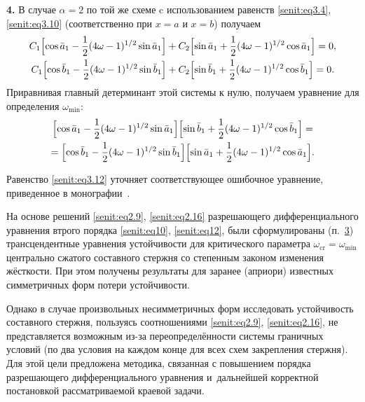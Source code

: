\textbf{4.} В случае $\alpha=2$  по той же схеме c  использованием равенств \eqref{senit:eq3.4},  \eqref{senit:eq3.10} (соответственно при $x=a$ и $x=b$) получаем
\begin{gather*}
C_1 \Bigl[\cos \bar {a}_1 - \frac{1}{2}(4\omega -1)^{{1}/{2}}\sin \bar {a}_1 \Bigr]+
C_2 \Bigl[ \sin \bar{a}_1 +\frac{1}{2}(4\omega -1)^{{1}/{2}}\cos \bar {a}_1 \Bigr]=0, \\
C_1 \Bigl[ \cos \bar {b}_1 -\frac{1}{2}(4\omega -1)^{{1}/{2}}\sin \bar {b}_1 \Bigr]+
C_2 \Bigl[ \sin \bar{b}_1 +\frac{1}{2}(4\omega -1)^{{1}/{2}}\cos \bar {b}_1 \Bigr]=0.
\end{gather*}
Приравнивая главный детерминант этой системы к нулю, получаем уравнение для определения $\omega_{\min}$:
\begin{multline}
\label{senit:eq3.12} 
\Bigl[ \cos \bar{a}_1 -\frac{1}{2}(4\omega
-1)^{{1}/{2}}\sin \bar{a}_1 \Bigr]
\Bigl[ \sin \bar {b}_1 +\frac{1}{2}(4\omega -1)^{{1}/{2}}\cos
\bar {b}_1 \Bigr]= \\
 =
 \Bigl[\cos \bar {b}_1 -\frac{1}{2} ( 4\omega -1)^{{1}/{2}}\sin \bar {b}_1 \Bigr]
 \Bigl[ \sin \bar {a}_1 +\frac{1}{2}(4\omega -1)^{{1}/{2}}\cos \bar {a}_1 \Bigr].
\end{multline}

Равенство \eqref{senit:eq3.12} уточняет соответствующее ошибочное уравнение, приведенное в монографии~\cite{senit:bib3}.

\smallskip

На основе решений \eqref{senit:eq2.9}, \eqref{senit:eq2.16} разрешающего
дифференциального уравнения втрого порядка \eqref{senit:eq10}, \eqref{senit:eq12},
были сформулированы (п.~\hyperlink{senit:p3}{3}) трансцендентные уравнения устойчивости для критического параметра $\omega _{\text{cr}} =\omega _{\min}$ центрально сжатого составного стержня со степенным
законом изменения жёсткости. 
При этом получены результаты для заранее (априори) известных симметричных форм потери устойчивости.

Однако в случае произвольных несимметричных форм исследовать устойчивость составного стержня, пользуясь соотношениями \eqref{senit:eq2.9}, \eqref{senit:eq2.16}, не представляется возможным из-за переопределённости системы граничных условий (по два условия на каждом конце для всех схем закрепления стержня). 
Для этой цели предложена методика, связанная с повышением порядка разрешающего
дифференциального уравнения и~дальнейшей корректной постановкой рассматриваемой краевой задачи.

